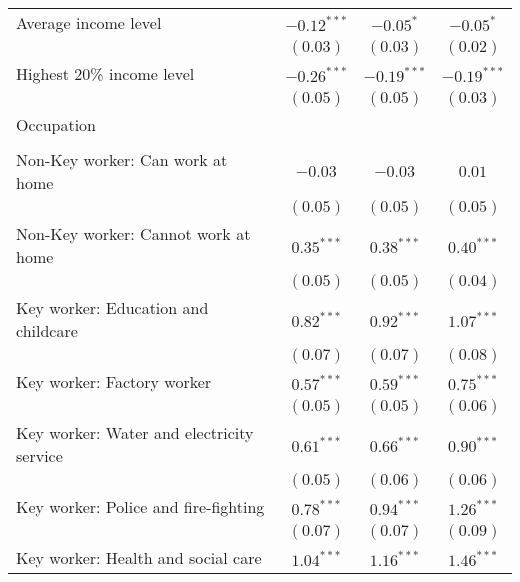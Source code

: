 \begin{table}
\begin{center}
\begin{scriptsize}
\begin{tabular}{l c c c}
\quad Average income level                      & $-0.12^{***}$ & $-0.05^{*}$   & $-0.05^{*}$   \\
                                                & $(0.03)$      & $(0.03)$      & $(0.02)$      \\
\quad Highest 20\% income level                 & $-0.26^{***}$ & $-0.19^{***}$ & $-0.19^{***}$ \\
                                                & $(0.05)$      & $(0.05)$      & $(0.03)$      \\
Occupation                                      &               &               &               \\
                                                &               &               &               \\
\quad Non-Key worker: Can work at home          & $-0.03$       & $-0.03$       & $0.01$        \\
                                                & $(0.05)$      & $(0.05)$      & $(0.05)$      \\
\quad Non-Key worker: Cannot work at home       & $0.35^{***}$  & $0.38^{***}$  & $0.40^{***}$  \\
                                                & $(0.05)$      & $(0.05)$      & $(0.04)$      \\
\quad Key worker: Education and childcare       & $0.82^{***}$  & $0.92^{***}$  & $1.07^{***}$  \\
                                                & $(0.07)$      & $(0.07)$      & $(0.08)$      \\
\quad Key worker: Factory worker                & $0.57^{***}$  & $0.59^{***}$  & $0.75^{***}$  \\
                                                & $(0.05)$      & $(0.05)$      & $(0.06)$      \\
\quad Key worker: Water and electricity service & $0.61^{***}$  & $0.66^{***}$  & $0.90^{***}$  \\
                                                & $(0.05)$      & $(0.06)$      & $(0.06)$      \\
\quad Key worker: Police and fire-fighting      & $0.78^{***}$  & $0.94^{***}$  & $1.26^{***}$  \\
                                                & $(0.07)$      & $(0.07)$      & $(0.09)$      \\
\quad Key worker: Health and social care        & $1.04^{***}$  & $1.16^{***}$  & $1.46^{***}$  \\

\end{tabular}
\end{scriptsize}
\end{center}
\end{table}
